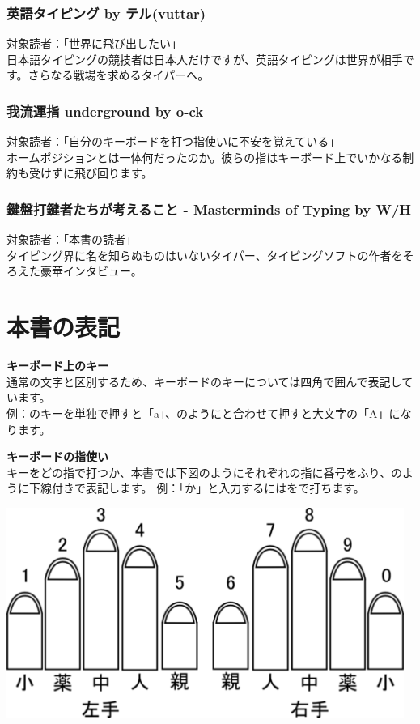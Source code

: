 \section*{英語タイピング \small{by テル(vuttar)}}
\noindent 対象読者：「世界に飛び出したい」\\
日本語タイピングの競技者は日本人だけですが、英語タイピングは世界が相手です。さらなる戦場を求めるタイパーへ。

\section*{我流運指 underground \small{by o-ck}}
\noindent 対象読者：「自分のキーボードを打つ指使いに不安を覚えている」\\
ホームポジションとは一体何だったのか。彼らの指はキーボード上でいかなる制約も受けずに飛び回ります。

\section*{鍵盤打鍵者たちが考えること - Masterminds of Typing \small{by W/H}}
\noindent 対象読者：「本書の読者」\\
タイピング界に名を知らぬものはいないタイパー、タイピングソフトの作者をそろえた豪華インタビュー。

\part*{本書の表記}
\textbf{キーボード上のキー}\\
通常の文字と区別するため、キーボードのキーについては四角で囲んで表記しています。\\
例：のキーを単独で押すと「a」、のようにと合わせて押すと大文字の「A」になります。

\textbf{キーボードの指使い}\\
キーをどの指で打つか、本書では下図のようにそれぞれの指に番号をふり、のように下線付きで表記します。
\noindent 例：「か」と入力するにはをで打ちます。

\vspace{3mm}
\includegraphics[width=13cm,clip]{res_tomoemon/finger.eps}
\vspace{-4mm}

